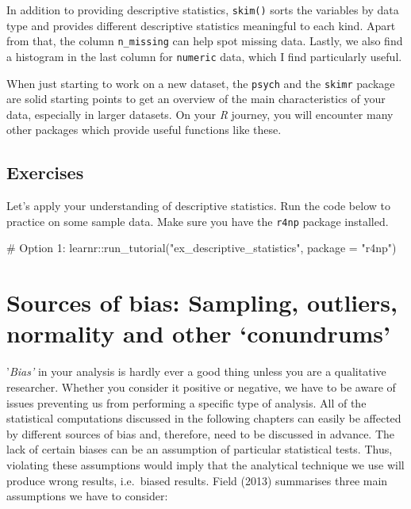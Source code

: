 \documentclass[
  letterpaper,
]{krantz}
\makeatletter
\newenvironment{Shaded}{\begin{snugshade}}{\end{snugshade}}
\newcommand{\AttributeTok}[1]{\textcolor[rgb]{0.40,0.45,0.13}{#1}}
\newcommand{\CommentTok}[1]{\textcolor[rgb]{0.37,0.37,0.37}{#1}}
\newcommand{\FunctionTok}[1]{\textcolor[rgb]{0.28,0.35,0.67}{#1}}
\newcommand{\NormalTok}[1]{\textcolor[rgb]{0.00,0.23,0.31}{#1}}
\newcommand{\SpecialCharTok}[1]{\textcolor[rgb]{0.37,0.37,0.37}{#1}}
\newcommand{\StringTok}[1]{\textcolor[rgb]{0.13,0.47,0.30}{#1}}
\newenvironment{kframe}{%
\medskip{}
\setlength{\fboxsep}{.8em}
 \def\at@end@of@kframe{}%
 \ifinner\ifhmode%
  \def\at@end@of@kframe{\end{minipage}}%
  \begin{minipage}{\columnwidth}%
 \fi\fi%
 \def\FrameCommand##1{\hskip\@totalleftmargin \hskip-\fboxsep
 \colorbox{shadecolor}{##1}\hskip-\fboxsep
     \hskip-\linewidth \hskip-\@totalleftmargin \hskip\columnwidth}%
 \MakeFramed {\advance\hsize-\width
   \@totalleftmargin\z@ \linewidth\hsize
   \@setminipage}}%
 {\par\unskip\endMakeFramed%
 \at@end@of@kframe}
\renewenvironment{Shaded}{\begin{kframe}}{\end{kframe}}
\makeatother
\begin{document}
In addition to providing descriptive statistics, \texttt{skim()} sorts
the variables by data type and provides different descriptive statistics
meaningful to each kind. Apart from that, the column \texttt{n\_missing}
can help spot missing data. Lastly, we also find a histogram in the last
column for \texttt{numeric} data, which I find particularly useful.

When just starting to work on a new dataset, the \texttt{psych} and the
\texttt{skimr} package are solid starting points to get an overview of
the main characteristics of your data, especially in larger datasets. On
your \emph{R} journey, you will encounter many other packages which
provide useful functions like these.

\section{Exercises}\label{sec-exercises-descriptive-statistics}

Let's apply your understanding of descriptive statistics. Run the code
below to practice on some sample data. Make sure you have the
\texttt{r4np} package installed.

\begin{Shaded}
\begin{Highlighting}[]
\CommentTok{\# Option 1:}
\NormalTok{learnr}\SpecialCharTok{::}\FunctionTok{run\_tutorial}\NormalTok{(}\StringTok{"ex\_descriptive\_statistics"}\NormalTok{, }\AttributeTok{package =} \StringTok{"r4np"}\NormalTok{)}
\end{Highlighting}
\end{Shaded}


\chapter{Sources of bias: Sampling, outliers, normality and other
`conundrums'}\label{sec-sources-of-bias}

'\emph{Bias'} in your analysis is hardly ever a good thing unless you
are a qualitative researcher. Whether you consider it positive or
negative, we have to be aware of issues preventing us from performing a
specific type of analysis. All of the statistical computations discussed
in the following chapters can easily be affected by different sources of
bias and, therefore, need to be discussed in advance. The lack of
certain biases can be an assumption of particular statistical tests.
Thus, violating these assumptions would imply that the analytical
technique we use will produce wrong results, i.e.~biased results. Field
(2013) summarises three main assumptions we have to consider:
\end{document}

